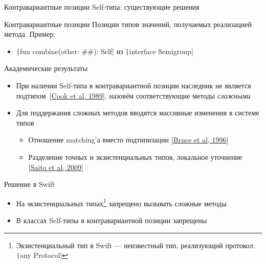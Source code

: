 \documentclass[usenames, dvipsnames]{beamer}
\begin{document}
    \begin{frame}[fragile]{Контравариантные позиции Self-типа: существующие решения}
        \begin{block}{Контравариантные позиции}
            Позиции типов значений, получаемых реализацией метода.
            Пример:
            \begin{itemize}
                \item \texttt|fun combine(other: ##): Self| из \texttt|interface Semigroup|
            \end{itemize}
        \end{block}

        \begin{block}{Академические результаты}
            \begin{itemize}
                \item При наличии Self-типа в контравариантной позиции наследник не является подтипом~[\href{https://dl.acm.org/doi/pdf/10.1145/96709.96721}{Cook et al, 1989}], назовём соответствующие методы \emph{сложными}
                \item Для поддержания сложных методов вводятся массивные изменения в системе типов
                \begin{itemize}
                    \item Отношение matching'а вместо подтипизации [\href{https://www.researchgate.net/profile/Kim-Bruce-2/publication/221496196_Subtyping_Is_Not_a_Good_Match_for_Object-Oriented_Languages/links/09e415122545c6d7a4000000/Subtyping-Is-Not-a-Good-Match-for-Object-Oriented-Languages.pdf}{Bruce et al, 1996}]
                    \item Разделение точных и экзистенциальных типов, локальное уточнение [\href{https://citeseerx.ist.psu.edu/document?repid=rep1&type=pdf&doi=a9d601d3bf8c921748902d58078d0a1b28f6ec4d}{Saito et al, 2009}]
                \end{itemize}
            \end{itemize}
        \end{block}

        \begin{block}{Решение в Swift}
            \begin{itemize}
                \item На экзистенциальных типах\footnote{Экзистенциальный тип в Swift --- неизвестный тип, реализующий протокол: \texttt|any Protocol|} запрещено вызывать сложные методы
                \item В классах Self-типы в контравариантной позиции запрещены
            \end{itemize}
        \end{block}
    \end{frame}
\end{document}
